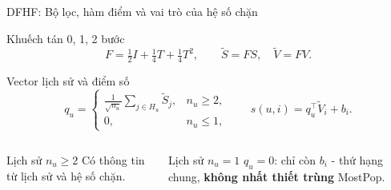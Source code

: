 \begin{frame}{DFHF: Bộ lọc, hàm điểm và vai trò của hệ số chặn}
\small
\begin{block}{Khuếch tán 0, 1, 2 bước}
\vspace{-0.15cm}
\[ F=\tfrac12 I+\tfrac14 T+\tfrac14 T^2,\qquad
 \widetilde S=FS,\quad \widetilde V=FV.\]
\vspace{-0.15cm}
\end{block}
\vspace{0.16cm}
\begin{block}{Vector lịch sử và điểm số}
\vspace{-0.17cm}
\[ q_u=\begin{cases}
 \displaystyle\frac{1}{\sqrt{n_u}}\sum_{j\in H_u}\widetilde S_j,&n_u\ge 2,\\
 0,&n_u\le 1,
 \end{cases}\qquad
 s(u,i)=q_u^\top\widetilde V_i+b_i.\]
\vspace{-0.15cm}
\end{block}
\vspace{0.3cm}
\begin{columns}[T,totalwidth=\textwidth]
\begin{block}{Lịch sử $n_u\ge 2$}
\small Có thông tin từ lịch sử và hệ số chặn.
\end{block}
\begin{block}{Lịch sử $n_u=1$}
\small $q_u=0$: chỉ còn $b_i$ - thứ hạng chung, \textbf{không nhất thiết trùng} MostPop.
\end{block}
\end{columns}
\end{frame}

